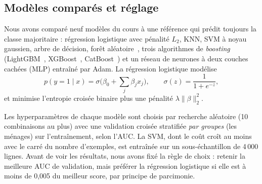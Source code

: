 \subsection{Modèles comparés et réglage}

Nous avons comparé neuf modèles du cours à une référence qui prédit toujours la classe majoritaire : régression logistique avec pénalité $L_2$, KNN, SVM à noyau gaussien, arbre de décision, forêt aléatoire~\cite{breiman2001}, trois algorithmes de \emph{boosting} (LightGBM~\cite{ke2017}, XGBoost~\cite{chen2016}, CatBoost~\cite{prokhorenkova2018}) et un réseau de neurones à deux couches cachées (MLP) entraîné par Adam. La régression logistique modélise
\begin{equation}
  p(y=1\mid x) = \sigma\Big(\beta_0 + \sum_j \beta_j x_j\Big), \qquad \sigma(z) = \frac{1}{1+e^{-z}},
\end{equation}
et minimise l'entropie croisée binaire plus une pénalité $\lambda\lVert\beta\rVert_2^2$.

Les hyperparamètres de chaque modèle sont choisis par recherche aléatoire (10 combinaisons au plus) avec une validation croisée stratifiée \emph{par groupes} (les ménages) sur l'entraînement, selon l'AUC. La SVM, dont le coût croît au moins avec le carré du nombre d'exemples, est entraînée sur un sous-échantillon de 4\,000 lignes. Avant de voir les résultats, nous avons fixé la règle de choix : retenir la meilleure AUC de validation, mais préférer la régression logistique si elle est à moins de 0,005 du meilleur score, par principe de parcimonie.

